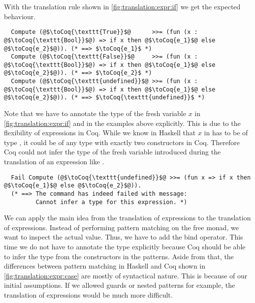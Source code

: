 With the translation rule shown in \autoref{fig:translation:expr:if} we get the expected behaviour.
\begin{verbatim}
  Compute (@$\toCoq{\texttt{True}}$@      >>= (fun (x : @$\toCoq{\texttt{Bool}}$@) => if x then @$\toCoq{e_1}$@ else @$\toCoq{e_2}$@)). (* ==> $\toCoq{e_1}$ *)
  Compute (@$\toCoq{\texttt{False}}$@     >>= (fun (x : @$\toCoq{\texttt{Bool}}$@) => if x then @$\toCoq{e_1}$@ else @$\toCoq{e_2}$@)). (* ==> $\toCoq{e_2}$ *)
  Compute (@$\toCoq{\texttt{undefined}}$@ >>= (fun (x : @$\toCoq{\texttt{Bool}}$@) => if x then @$\toCoq{e_1}$@ else @$\toCoq{e_2}$@)). (* ==> $\toCoq{\texttt{undefined}}$ *)
\end{verbatim}

Note that we have to annotate the type of the fresh variable $x$ in \autoref{fig:translation:expr:if} and in the examples above explicitly.
This is due to the flexibility of  expressions in Coq.
While we know in Haskell that $x$ in  has to be of type , it could be of any type with exactly two constructors in Coq.
Therefore Coq could not infer the type of the fresh variable introduced during the translation of an expression like .
\begin{verbatim}
  Fail Compute (@$\toCoq{\texttt{undefined}}$@ >>= (fun x => if x then @$\toCoq{e_1}$@ else @$\toCoq{e_2}$@)).
  (* ==> The command has indeed failed with message:
         Cannot infer a type for this expression. *)
\end{verbatim}

We can apply the main idea from the translation of  expressions to the translation of  expressions.
Instead of performing pattern matching on the free monad, we want to inspect the actual value.
Thus, we have to add the bind operator.
This time we do not have to annotate the type explicitly because Coq should be able to infer the type from the constructors in the patterns.
Aside from that, the differences between pattern matching in Haskell and Coq shown in \autoref{fig:translation:expr:case} are mostly of syntactical nature.
This is because of our initial assumptions.
If we allowed guards or nested patterns for example, the translation of  expressions would be much more difficult.

